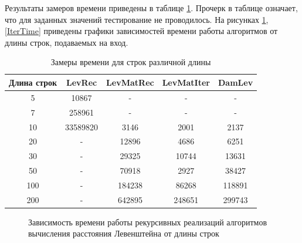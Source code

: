 \documentclass[12pt]{report}
\begin{document}
Результаты замеров времени приведены в таблице \ref{time}. Прочерк в таблице означает, что для заданных значений тестирование не проводилось. На рисунках \ref{recTime}, \ref{IterTime} приведены графики зависимостей времени работы алгоритмов от длины строк, подаваемых на вход.

\begin{table}[h]
	\begin{center}
		\caption{\label{time} Замеры времени для строк различной длины}
		\begin{tabular}{|c c c c c|} 
 			\hline
			Длина строк & LevRec & LevMatRec & LevMatIter & DamLev \\ [0.5ex] 
 			\hline\hline
 			5 & 10867 & - & - & -\\
 			\hline
 			7 & 258961 & - & - & -\\
 			\hline
			10 & 33589820 & 3146 & 2001 & 2137\\
			\hline
			20 & - & 12896 & 4686 & 6251\\
			\hline
			30 & - & 29325 & 10744 & 13631\\
			\hline
			50 & - & 70918 & 2927 & 38427\\
			\hline
			100 & - & 184238 & 86268 & 118891\\
			\hline
			200 & - & 642895 & 248651 & 299743\\
			\hline
			\end{tabular}
	\end{center}
\end{table}

\begin{figure}[h]
\begin{center}
	\captionsetup{justification=centering}
	\caption{Зависимость времени работы рекурсивных реализаций алгоритмов вычисления расстояния Левенштейна от длины строк}
	\label{recTime}
	\end{center}
\end{figure}
\end{document}
